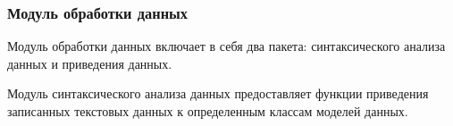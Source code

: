 
\subsubsection{Модуль обработки данных}

Модуль обработки данных включает в себя два пакета: синтаксического анализа данных и приведения данных.

Модуль синтаксического анализа данных предоставляет функции приведения записанных текстовых данных к определенным классам моделей данных.

